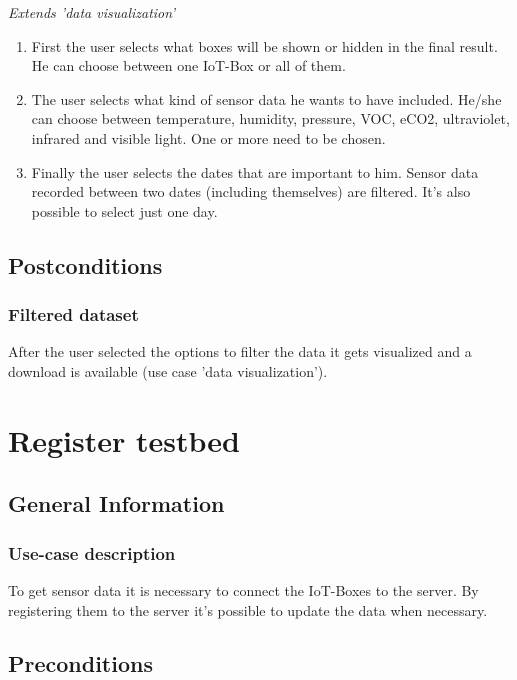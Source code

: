 \documentclass[notitlepage]{article}
\begin{document}
\textit{Extends 'data visualization'}

\begin{enumerate}
	
	\item First the user selects what boxes will be shown or hidden in the final result. He can choose between one IoT-Box or all of them.
	      
	\item The user selects what kind of sensor data he wants to have included. He/she can choose between temperature, humidity, pressure, VOC, eCO2, ultraviolet, infrared and visible light. One or more need to be chosen.
	      
	\item Finally the user selects the dates that are important to him. Sensor data recorded between two dates (including themselves) are filtered. It's also possible to select just one day.
	      
\end{enumerate}

\subsection{Postconditions}

\subsubsection{Filtered dataset}
After the user selected the options to filter the data it gets visualized and a download is available (use case 'data visualization').


\section{Register testbed}

\subsection{General Information}
\subsubsection{Use-case description}
To get sensor data it is necessary to connect the IoT-Boxes to the server. By registering them to the server it's possible to update the data when necessary.

\subsection{Preconditions}
\end{document}
